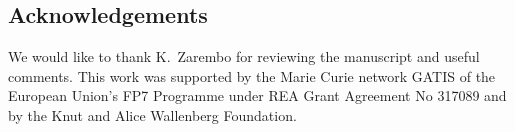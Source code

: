 \subsection*{Acknowledgements}
We would like to thank K.~Zarembo for reviewing the manuscript and useful comments.
This work was supported by the Marie Curie network GATIS of the European Union's FP7 Programme under REA Grant Agreement No 317089 and by the Knut and Alice Wallenberg Foundation.
